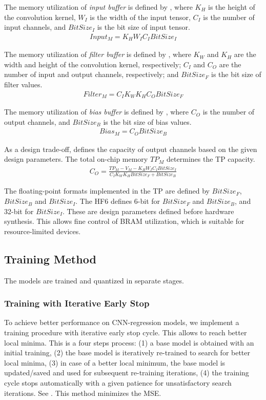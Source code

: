 The memory utilization of \emph{input buffer} is defined by , where $K_{H}$ is the height of the convolution kernel, $W_{I}$ is the width of the input tensor, $C_{I}$ is the number of input channels, and $BitSize_{I}$ is the bit size of input tensor.
\begin{eqnarray} \label{eq:input_memory}
Input_{M}=K_{H}W_{I}C_{I}BitSize_{I}
\end{eqnarray}

The memory utilization of \emph{filter buffer} is defined by , where $K_{W}$ and $K_{H}$ are the width and height of the convolution kernel, respectively; $C_{I}$ and $C_{O}$ are the number of input and output channels, respectively; and $BitSize_{F}$ is the bit size of filter values.
\begin{eqnarray} \label{eq:filter_memory}
Filter_{M}=C_{I}K_{W}K_{H}C_{O}BitSize_{F}
\end{eqnarray}

The memory utilization of \emph{bias buffer} is defined by , where $C_{O}$ is the number of output channels, and $BitSize_{B}$ is the bit size of bias values.
\begin{eqnarray} \label{eq:bias_memory}
Bias_{M}=C_{O}BitSize_{B}
\end{eqnarray}

As a design trade-off,  defines the capacity of output channels based on the given design parameters. The total on-chip memory $TP_{M}$ determines the TP capacity.
\begin{eqnarray} \label{eq:channel_in_memory}
C_{O}=\frac{TP_{M}-V_{M}-K_{H}W_{I}C_{I}BitSize_{I}}{C_{I}K_{W}K_{H}BitSize_{F}+BitSize_{B}}
\end{eqnarray}

The floating-point formats implemented in the TP are defined by $BitSize_F$, $BitSize_B$ and $BitSize_I$. The HF6 defines 6-bit for $BitSize_F$ and $BitSize_B$, and 32-bit for $BitSize_I$. These are design parameters defined before hardware synthesis. This allows fine control of BRAM utilization, which is suitable for resource-limited devices.

\subsection{Training Method}
The models are trained and quantized in separate stages.
\subsubsection{Training with Iterative Early Stop}
To achieve better performance on CNN-regression models, we implement a training procedure with iterative early stop cycle. This allows to reach better local minima. This is a four steps process: (1) a base model is obtained with an initial training, (2) the base model is iteratively re-trained to search for better local minima, (3) in case of a better local minimum, the base model is updated/saved and used for subsequent re-training iterations, (4) the training cycle stops automatically with a given patience for unsatisfactory search iterations. See . This method minimizes the MSE.

